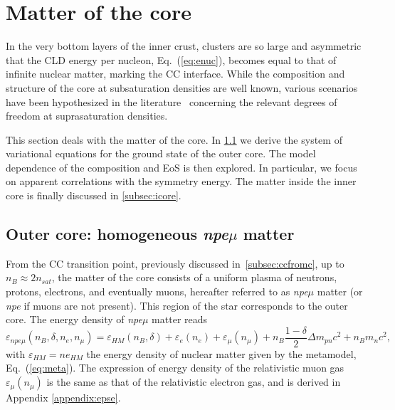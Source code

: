 
\section{Matter of the core}\label{sec:core}

In the very bottom layers of the inner crust, clusters are so large and
asymmetric that the CLD energy per nucleon, Eq.~(\ref{eq:enuc}), becomes equal to 
that of infinite nuclear matter, marking the CC interface. While the
composition and structure of the core at subsaturation densities are well
known, various scenarios have been hypothesized in the
literature~\cite{Oertel2017} concerning the relevant degrees of freedom 
at suprasaturation densities. 

This section deals with the matter of the core. In \ref{subsec:ocore} we derive
the system of variational equations for the ground state of the outer core. The
model dependence of the composition and EoS is then explored. In particular, we
focus on apparent correlations with the symmetry energy. The matter inside the 
inner core is finally discussed in \ref{subsec:icore}.

\subsection{Outer core: homogeneous \textit{npe$\mu$}
matter}\label{subsec:ocore}

From the CC transition point, previously discussed in~\ref{subsec:ccfromc}, up to 
$n_B \approx 2n_{sat}$, the matter of the core consists of a uniform plasma of 
neutrons, protons, electrons, and eventually muons, hereafter referred to 
as \textit{npe$\mu$} matter (or \textit{npe} if muons are not
present). This region of the star corresponds to the outer core.
The energy density of \textit{npe$\mu$} matter reads
%
\begin{equation}
  \varepsilon_{npe\mu}(n_B,\delta,n_e,n_{\mu}) = \varepsilon_{HM}(n_B,\delta) +
  \varepsilon_{e}(n_e) + \varepsilon_{\mu}(n_{\mu}) + n_B\frac{1-\delta}{2}\Delta
  m_{pn}c^2 + n_B m_n c^2,\label{eq:epscore}
\end{equation}
%
with $\varepsilon_{HM} = ne_{HM}$ the energy density of nuclear matter 
given by the metamodel, Eq.~(\ref{eq:meta}). The expression of energy density
of the relativistic muon gas $\varepsilon_{\mu}(n_{\mu})$ is the same as that 
of the relativistic electron gas, and is derived in Appendix \ref{appendix:epse}.

